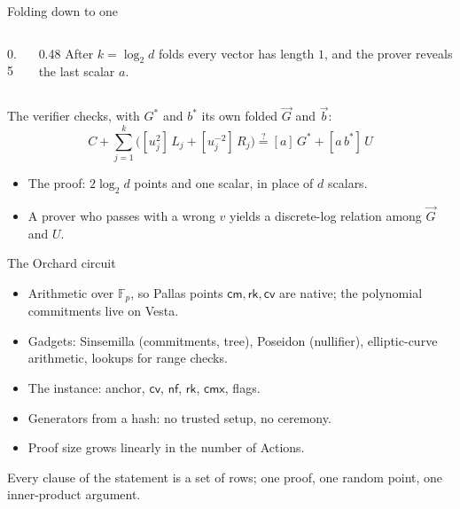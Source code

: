 \documentclass[aspectratio=169,11pt]{beamer}
\newcommand{\F}{\mathbb{F}}
\newcommand{\Fpp}{\ensuremath{\F_{p}}}
\newcommand{\nfsym}{\ensuremath{\mathsf{nf}}}
\newcommand{\cmsym}{\ensuremath{\mathsf{cm}}}
\newcommand{\cmx}{\ensuremath{\mathsf{cmx}}}
\newcommand{\cvsym}{\ensuremath{\mathsf{cv}}}
\newcommand{\rksym}{\ensuremath{\mathsf{rk}}}
\begin{document}
\begin{frame}{Folding down to one}
\begin{columns}[c]
\begin{column}{0.5\textwidth}
\centering
{}
\end{column}
\begin{column}{0.48\textwidth}
After $k = \log_2 d$ folds every vector has length $1$, and the prover
reveals the last scalar $a$.
\end{column}
\end{columns}
\vfill
The verifier checks, with $G^{*}$ and $b^{*}$ its own folded $\vec G$ and
$\vec b$:
\[
C + \sum_{j=1}^{k}\bigl([u_j^2]\,L_j + [u_j^{-2}]\,R_j\bigr)
\overset{?}{=} [a]\,G^{*} + [a\,b^{*}]\,U
\]
\vfill
\begin{itemize}\itemsep4pt
  \item The proof: $2 \log_2 d$ points and one scalar, in place of $d$
    scalars.
  \item A prover who passes with a wrong $v$ yields a discrete-log relation
    among $\vec G$ and $U$.
\end{itemize}
\end{frame}

\begin{frame}{The Orchard circuit}
\begin{itemize}\itemsep6pt
  \item Arithmetic over $\Fpp$, so Pallas points $\cmsym, \rksym, \cvsym$ are
    native; the polynomial commitments live on Vesta.
  \item Gadgets: Sinsemilla (commitments, tree), Poseidon (nullifier),
    elliptic-curve arithmetic, lookups for range checks.
  \item The instance: anchor, $\cvsym$, $\nfsym$, $\rksym$, $\cmx$, flags.
  \item Generators from a hash: no trusted setup, no ceremony.
  \item Proof size grows linearly in the number of Actions.
\end{itemize}
\vfill
Every clause of the statement is a set of rows; one proof, one random
point, one inner-product argument.
\end{frame}
\end{document}
